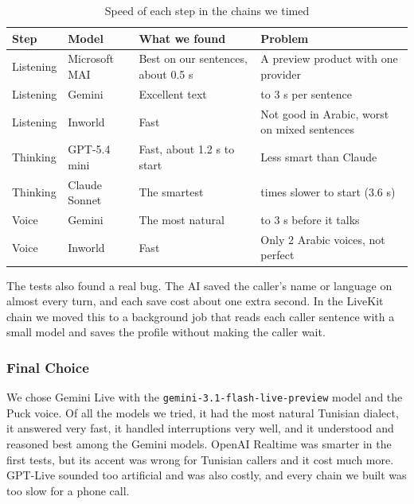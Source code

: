 \begin{table}[H]
    \centering
    \caption{Speed of each step in the chains we timed}
    \label{tab:voice-model-comparison}
    \small
    \begin{tabular}{>{\raggedright\arraybackslash}p{\dimexpr 0.1571\dimexpr\textwidth-8\tabcolsep\relax\relax}>{\raggedright\arraybackslash}p{\dimexpr 0.2143\dimexpr\textwidth-8\tabcolsep\relax\relax}>{\raggedright\arraybackslash}p{\dimexpr 0.3143\dimexpr\textwidth-8\tabcolsep\relax\relax}>{\raggedright\arraybackslash}p{\dimexpr 0.3143\dimexpr\textwidth-8\tabcolsep\relax\relax}}
        \toprule
        \textbf{Step} & \textbf{Model} & \textbf{What we found} & \textbf{Problem} \\
        \midrule
        Listening & Microsoft MAI & Best on our sentences, about 0.5 s & A preview product with one provider \\
        Listening & Gemini & Excellent text & 2 to 3 s per sentence \\
        Listening & Inworld & Fast & Not good in Arabic, worst on mixed sentences \\
        Thinking & GPT-5.4 mini & Fast, about 1.2 s to start & Less smart than Claude \\
        Thinking & Claude Sonnet & The smartest & 3 times slower to start (3.6 s) \\
        Voice & Gemini & The most natural & 2 to 3 s before it talks \\
        Voice & Inworld & Fast & Only 2 Arabic voices, not perfect \\
        \bottomrule
    \end{tabular}
\end{table}

The tests also found a real bug. The AI saved the caller's name or language on almost every turn, and each save cost about one extra second. In the LiveKit chain we moved this to a background job that reads each caller sentence with a small model and saves the profile without making the caller wait.

\subsubsection{Final Choice}

We chose Gemini Live with the \texttt{gemini-3.1-flash-live-preview} model and the Puck voice. Of all the models we tried, it had the most natural Tunisian dialect, it answered very fast, it handled interruptions very well, and it understood and reasoned best among the Gemini models. OpenAI Realtime was smarter in the first tests, but its accent was wrong for Tunisian callers and it cost much more. GPT-Live sounded too artificial and was also costly, and every chain we built was too slow for a phone call.

